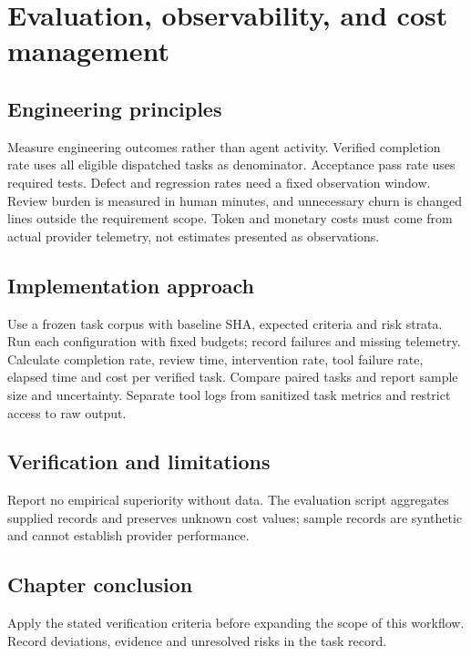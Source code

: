 \chapter{Evaluation, observability, and cost management}

\section{Engineering principles}

Measure engineering outcomes rather than agent activity. Verified completion rate uses all eligible dispatched tasks as denominator. Acceptance pass rate uses required tests. Defect and regression rates need a fixed observation window. Review burden is measured in human minutes, and unnecessary churn is changed lines outside the requirement scope. Token and monetary costs must come from actual provider telemetry, not estimates presented as observations.

\section{Implementation approach}

Use a frozen task corpus with baseline SHA, expected criteria and risk strata. Run each configuration with fixed budgets; record failures and missing telemetry. Calculate completion rate, review time, intervention rate, tool failure rate, elapsed time and cost per verified task. Compare paired tasks and report sample size and uncertainty. Separate tool logs from sanitized task metrics and restrict access to raw output.

\section{Verification and limitations}

Report no empirical superiority without data. The evaluation script aggregates supplied records and preserves unknown cost values; sample records are synthetic and cannot establish provider performance.

\section{Chapter conclusion}

Apply the stated verification criteria before expanding the scope of this workflow. Record deviations, evidence and unresolved risks in the task record.
